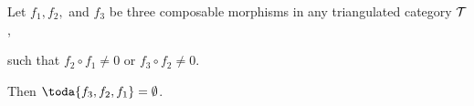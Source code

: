 \begin{proposition}
	Let \( f_1, f_2, \) and \( f_3 \) be three composable morphisms in any triangulated category \( {\mathcal{T}} \),
	\begin{center}
	\end{center}
	such that \( f_2 \circ f_1 \neq 0 \) or \( f_3 \circ f_2 \neq 0 \).

	Then \( \toda{f_3, f_2, f_1} = \emptyset \).
\end{proposition}

